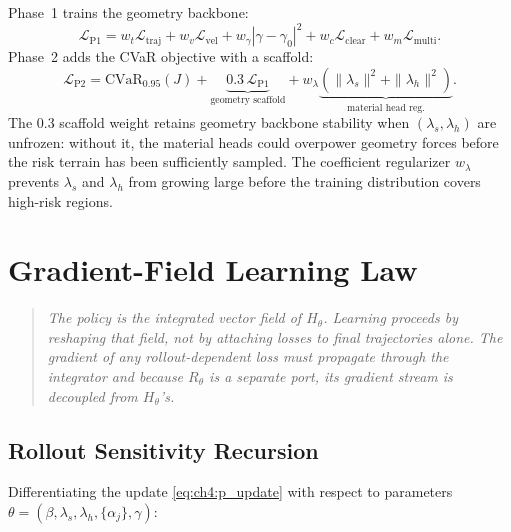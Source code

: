 Phase~1 trains the geometry backbone:
\begin{equation}
  \mathcal{L}_{\mathrm{P1}}
  = w_t\mathcal{L}_{\mathrm{traj}}
  + w_v\mathcal{L}_{\mathrm{vel}}
  + w_\gamma|\gamma-\gamma_0|^2
  + w_c\mathcal{L}_{\mathrm{clear}}
  + w_m\mathcal{L}_{\mathrm{multi}}.
  \label{eq:ch4:LP1}
\end{equation}
Phase~2 adds the CVaR objective with a scaffold:
\begin{equation}
  \mathcal{L}_{\mathrm{P2}}
  = \mathrm{CVaR}_{0.95}(J)
  + \underbrace{0.3\,\mathcal{L}_{\mathrm{P1}}}_{\text{geometry scaffold}}
  + w_\lambda\underbrace{(\|\lambda_s\|^2+\|\lambda_h\|^2)}_{\text{material head reg.}}.
  \label{eq:ch4:LP2}
\end{equation}
The 0.3 scaffold weight retains geometry backbone stability when
$(\lambda_s,\lambda_h)$ are unfrozen: without it, the material
heads could overpower geometry forces before the risk terrain has
been sufficiently sampled.
The coefficient regularizer $w_\lambda$ prevents $\lambda_s$
and $\lambda_h$ from growing large before the training distribution
covers high-risk regions.

\section{Gradient-Field Learning Law}
\label{sec:ch4:gradients}

\begin{quote}\itshape
The policy is the integrated vector field of $H_\theta$.
Learning proceeds by reshaping that field, not by attaching losses
to final trajectories alone.
The gradient of any rollout-dependent loss must propagate through
the integrator and because $R_\theta$ is a separate port, its
gradient stream is decoupled from $H_\theta$'s.
\end{quote}

\subsection{Rollout Sensitivity Recursion}
\label{subsec:ch4:sensitivity}

Differentiating the update \eqref{eq:ch4:p_update} with respect to
parameters $\theta = (\beta,\lambda_s,\lambda_h,\{\alpha_j\},\gamma)$:

